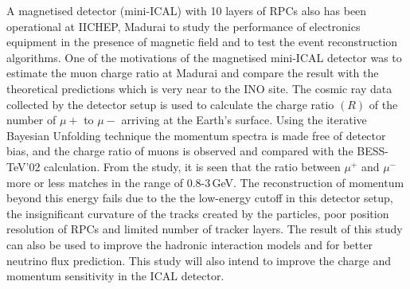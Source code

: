 A magnetised detector (mini-ICAL) with 10 layers of RPCs also has been
operational at IICHEP, Madurai to study the performance of electronics
equipment in the presence of magnetic field and to test the event
reconstruction algorithms. One of the motivations of the magnetised
mini-ICAL detector was to estimate the muon charge ratio at Madurai
and compare the result with the theoretical predictions which is very
near to the INO site.
The cosmic ray data collected by the detector setup is used to
calculate the charge ratio $(R)$ of the number of $\mu+$ to $\mu-$
arriving at the Earth's surface. Using the iterative Bayesian
Unfolding technique the momentum spectra is made free of detector
bias, and the charge ratio of muons is observed and compared with the
BESS-TeV'02 calculation.
From the study, it is seen that the ratio between $\mu^{+}$ and
$\mu^{-}$ more or less matches in the range of 0.8-3\,GeV.
The reconstruction of momentum beyond this energy fails due to
the the low-energy cutoff in this detector setup, the insignificant
curvature of the tracks created by the particles, poor position
resolution of RPCs and limited number of tracker layers. The result
of this study can also be used to improve the hadronic interaction
models and for better neutrino flux prediction. This study will
also intend to improve the charge and momentum sensitivity in the
ICAL detector.
